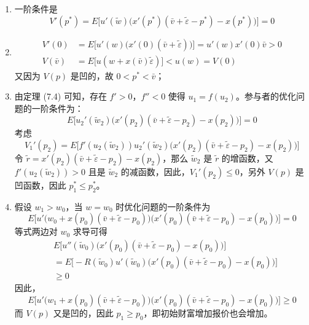 \begin{solution}
\begin{enumerate}[label=(\alph*)]
    \item 一阶条件是
    \[
        V'(p^{*})=E\bigl[u'(\tilde{w})\bigl(x'(p^{*})(\bar{v}+\tilde{\varepsilon}-p^{*})-x(p^{*})\bigr)\bigr]=0
    \]

    \item
    \[
        \begin{aligned}
            V'(0)&=E\bigl[u'(w)\bigl(x'(0)(\bar{v}+\tilde{\varepsilon})\bigr)\bigr]=u'(w)x'(0)\bar{v}>0\\
            V(\bar{v})&=E\bigl[u(w+x(\bar{v})\tilde{\varepsilon})\bigr]<u(w)=V(0)
        \end{aligned}
    \]
    又因为 $V(p)$ 是凹的，故 $0<p^{*}<\bar{v}$；

    \item 由定理 (7.4) 可知，存在 $f'>0$，$f''<0$ 使得 $u_{1}=f(u_{2})$。参与者的优化问题的一阶条件为：
    \[
        E\bigl[u_{2}'(\tilde{w}_{2})\bigl(x'(p_{2})(\bar{v}+\tilde{\varepsilon}-p_{2})-x(p_{2})\bigr)\bigr]=0
    \]
    考虑
    \[
        V_{1}'(p_{2})=E\bigl[f'(u_{2}(\tilde{w}_{2}))u_{2}'(\tilde{w}_{2})\bigl(x'(p_{2})(\bar{v}+\tilde{\varepsilon}-p_{2})-x(p_{2})\bigr)\bigr]
    \]
    令 $\tilde{r}=x'(p_{2})(\bar{v}+\tilde{\varepsilon}-p_{2})-x(p_{2})$，那么 $\tilde{w}_{2}$ 是 $\tilde{r}$ 的增函数，又 $f'(u_{2}(\tilde{w}_{2}))>0$ 且是 $\tilde{w}_{2}$ 的减函数，因此，$V_{1}'(p_{2})\le 0$，另外 $V(p)$ 是凹函数，因此 $p_{1}^{*}\le p_{2}^{*}$。

    \item 假设 $w_{1}>w_{0}$，当 $w=w_{0}$ 时优化问题的一阶条件为
    \[
        E\bigl[u'\bigl(w_{0}+x(p_{0})(\bar{v}+\tilde{\varepsilon}-p_{0})\bigr)\bigl(x'(p_{0})(\bar{v}+\tilde{\varepsilon}-p_{0})-x(p_{0})\bigr)\bigr]=0
    \]
    等式两边对 $w_{0}$ 求导可得
    \[
        \begin{aligned}
            &E\bigl[u''(\tilde{w}_{0})\bigl(x'(p_{0})(\bar{v}+\tilde{\varepsilon}-p_{0})-x(p_{0})\bigr)\bigr]\\
            &=E\bigl[-R(\tilde{w}_{0})u'(\tilde{w}_{0})\bigl(x'(p_{0})(\bar{v}+\tilde{\varepsilon}-p_{0})-x(p_{0})\bigr)\bigr]\\
            &\ge 0
        \end{aligned}
    \]
    因此，
    \[
        E\bigl[u'\bigl(w_{1}+x(p_{0})(\bar{v}+\tilde{\varepsilon}-p_{0})\bigr)\bigl(x'(p_{0})(\bar{v}+\tilde{\varepsilon}-p_{0})-x(p_{0})\bigr)\bigr]\ge 0
    \]
    而 $V(p)$ 又是凹的，因此 $p_{1}\ge p_{0}$，即初始财富增加报价也会增加。
\end{enumerate}
\end{solution}

